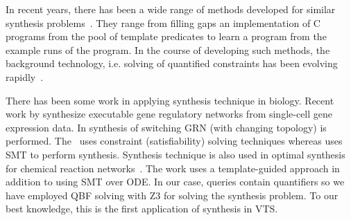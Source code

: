 In recent years, there has been a wide range of methods
developed for similar synthesis problems~\cite{sketch,sygus,exampleSynth}.
%
They range from filling gaps an implementation of C programs from the pool of template predicates to learn a program from the example
runs of the program.
%
In the course of developing such methods,
the background technology, i.e. solving of quantified
constraints has been evolving rapidly~\cite{lonsing2010depqbf,z3Quant}.
%

There has been some work in applying synthesis technique in biology. 
%
Recent work by \cite{fisher2015synthesising} synthesize executable gene regulatory networks from single-cell gene expression data.
%
In \cite{shavit2016automated} synthesis of switching GRN (with changing topology) is performed.
%
The~\cite{fisher2015synthesising} uses constraint (satisfiability) solving techniques whereas \cite{shavit2016automated} uses SMT to perform synthesis. 
%
Synthesis technique is also used in optimal synthesis for chemical reaction networks~\cite{cardelli2017syntax}.
%
%
The work uses a template-guided approach in addition to using SMT over ODE. In our case, queries contain quantifiers so we have employed QBF solving with Z3 for solving the synthesis problem. 
%
To our best knowledge, this is the first application of synthesis in VTS.
